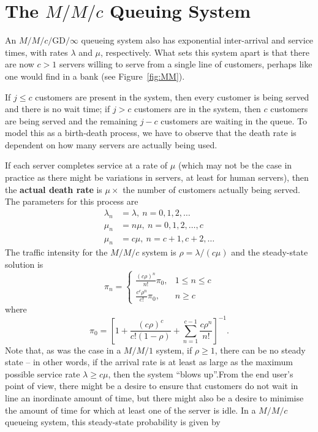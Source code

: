 \section{The $M/M/c$ Queuing System}
An $M/M/c/\textrm{GD}/\infty$ queueing system also has exponential inter-arrival and service times, with rates $\lambda$ and $\mu$, respectively. What sets this system apart is that there are now $c>1$ servers willing to serve from a single line of customers, perhaps like one would find in a bank (see Figure~\ref{fig:MM}). \par If $j \leq c$ customers are present in the system, then every customer is being served and there is no wait time; if $j > c$ customers are in the system, then $c$ customers are being served and the remaining $j - c$ customers are waiting in the queue. \newl
To model this as a birth-death process, we have to observe that the death rate is dependent on how many servers are actually being used. \par If each server completes service at a rate of $\mu$ (which may not be the case in practice as there might be variations in servers, at least for human servers), then the \textbf{actual death rate} is $\mu \times$ the number of customers actually being served. The parameters for this process are
\begin{align*}
\lambda_{n} &= \lambda, \ n=0,1,2,\ldots \\ 
\mu_n &= n\mu, \ n=0,1,2, \ldots, c \\
\mu_{n} &= c\mu,\  n=c+1,c+2,\ldots 
\end{align*}
The traffic intensity for the $M/M/c$ system is $\rho = \lambda/(c \mu)$ and the steady-state solution is 
$$
 \pi_{n} = 
\begin{cases}
     \frac{\left(c \rho\right)^{n}}{n!} \pi_{0},      & \text{$1\leq n \leq c$}  \\ 
     \frac{c^{c} \rho^{n}}{c!} \pi_{0},   & \text{$n \geq c$} 
\end{cases}
$$
where 
$$
\pi_{0} = \left[1 + \frac{\left(c \rho\right)^{c}}{c! \left(1-\rho\right)} + \sum^{c-1}_{n=1} \frac{c \rho^{n}}{n!}\right]^{-1}\!\!. $$
Note that, as was the case in a $M/M/1$ system, if $\rho \geq 1$, there can be no steady state -- in other words, if the arrival rate is at least as large as the maximum possible service rate $\lambda \geq c \mu$, then the system ``blows up''.\newl From the end user's point of view, there might be a desire to ensure that customers do not wait in line an inordinate amount of time, but there might also be a desire to minimise the amount of time for which at least one of the server is idle. In a $M/M/c$ queueing system, this steady-state probability is given by 
